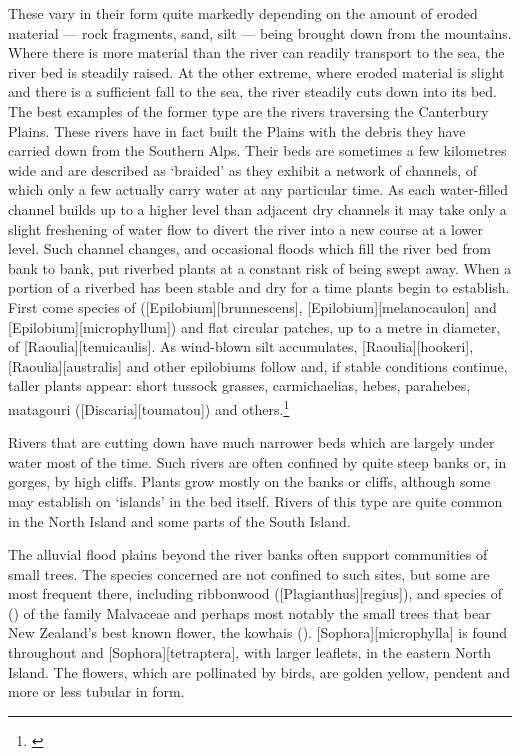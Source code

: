 These vary in their form quite markedly depending on the amount of eroded material --- rock fragments, sand, silt --- being brought down from the mountains.
Where there is more material than the river can readily transport to the sea, the river bed is steadily raised.
At the other extreme, where eroded material is slight and there is a sufficient fall to the sea, the river steadily cuts down into its bed.
The best examples of the former type are the rivers traversing the Canterbury Plains.
These rivers have in fact built the Plains with the debris they have carried down from the Southern Alps.
Their beds are sometimes a few kilometres wide and are described as `braided' as they exhibit a network of channels, of which only a few actually carry water at any particular time.
As each water-filled channel builds up to a higher level than adjacent dry channels it may take only a slight freshening of water flow to divert the river into a new course at a lower level.
Such channel changes, and occasional floods which fill the river bed from bank to bank, put riverbed plants at a constant risk of being swept away.
When a portion of a riverbed has been stable and dry for a time plants begin to establish.
First come species of  ([Epilobium][brunnescens], [Epilobium][melanocaulon] and [Epilobium][microphyllum]) and flat circular patches, up to a metre in diameter, of [Raoulia][tenuicaulis].
As wind-blown silt accumulates, [Raoulia][hookeri], [Raoulia][australis] and other epilobiums follow and, if stable conditions continue, taller plants appear: short tussock grasses, carmichaelias, hebes, parahebes, matagouri ([Discaria][toumatou]) and others.\footnote{\cite{calder1961plant}}

Rivers that are cutting down have much narrower beds which are largely under water most of the time.
Such rivers are often confined by quite steep banks or, in gorges, by high cliffs.
Plants grow mostly on the banks or cliffs, although some may establish on `islands' in the bed itself.
Rivers of this type are quite common in the North Island and some parts of the South Island.

The alluvial flood plains beyond the river banks often support communities of small trees.
The species concerned are not confined to such sites, but some are most frequent there, including ribbonwood ([Plagianthus][regius]), and species of  () of the family Malvaceae and perhaps most notably the small trees that bear New Zealand's best known flower, the kowhais ().  [Sophora][microphylla] is found throughout and [Sophora][tetraptera], with larger leaflets, in the eastern North Island.
The flowers, which are pollinated by birds, are golden yellow, pendent and more or less tubular in form.

